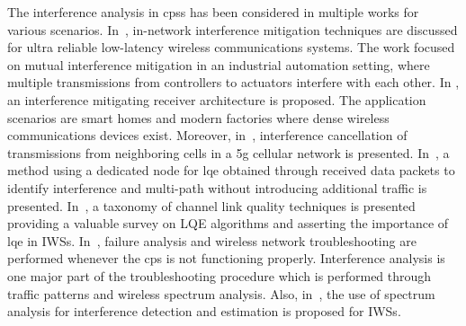 The interference analysis in \glspl{cps} has been considered in multiple works for various scenarios. In~\cite{8639006}, in-network interference mitigation techniques are discussed for ultra reliable low-latency wireless communications systems. The work focused on mutual interference mitigation in an industrial automation setting, where multiple transmissions from controllers to actuators interfere with each other. In \cite{Kumar2019}, an interference mitigating receiver architecture is proposed. The application scenarios are smart homes and modern factories where dense wireless communications devices exist. Moreover, in~\cite{Bhushan2014.NetworkDesensUsingIntfCancellation}, interference cancellation of transmissions from neighboring cells in a \gls{5g} cellular network is presented. In~\cite{Gomes2017.LQEinWSNs}, a method using a dedicated node for \gls{lqe}  obtained through received data packets to identify interference and multi-path without introducing additional traffic is presented. In~\cite{Baccour2012.SurveyOnLinkEstimation}, a taxonomy of channel link quality techniques is presented providing a valuable survey on LQE algorithms and asserting the importance of \gls{lqe} in IWSs. In~\cite{Frounhoffer.Troubleshooting}, failure analysis and wireless network troubleshooting are performed whenever the \gls{cps} is not functioning properly. Interference analysis is one major part of the troubleshooting procedure which is performed through traffic patterns and wireless spectrum analysis. Also, in~\cite{NIST.InterfCoexCritical}, the use of spectrum analysis for interference detection and estimation is proposed for IWSs. 

